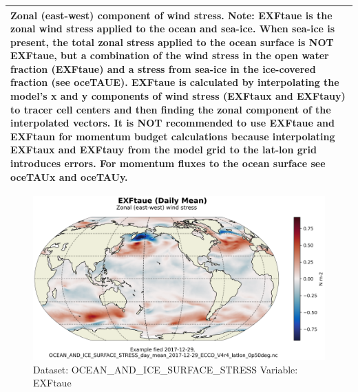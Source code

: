 \begin{longtable}{|m{}|m{}|m{}|m{}|}
\multicolumn{4}{|p{1\textwidth}|}{Zonal (east-west) component of wind stress. Note: EXFtaue is the zonal wind stress applied to the ocean and sea-ice. When sea-ice is present, the total zonal stress applied to the ocean surface is NOT EXFtaue, but a combination of the wind stress in the open water fraction (EXFtaue) and a stress from sea-ice in the ice-covered fraction (see oceTAUE). EXFtaue is calculated by interpolating the model's x and y components of wind stress (EXFtaux and EXFtauy) to tracer cell centers and then finding the zonal component of the interpolated vectors. It is NOT recommended to use EXFtaue and EXFtaun for momentum budget calculations because interpolating EXFtaux and EXFtauy from the model grid to the lat-lon grid introduces errors. For momentum fluxes to the ocean surface see oceTAUx and oceTAUy.} \\ \hline
\end{longtable}

\begin{figure}[H]
\centering
\includegraphics[scale=0.55]{../images/plots/latlon_plots/Ocean_and_Sea-Ice_Surface_Stress/EXFtaue.png}
\caption{Dataset: OCEAN\_AND\_ICE\_SURFACE\_STRESS Variable: EXFtaue}
\label{tab:table-OCEAN_AND_ICE_SURFACE_STRESS_EXFtaue-Plot}
\end{figure}
\pagebreak
